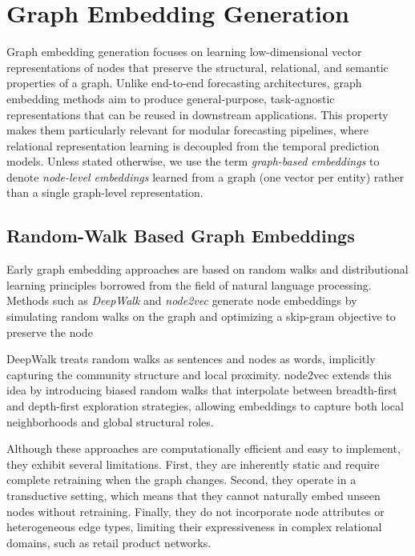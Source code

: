 \section{Graph Embedding Generation}
\label{sec:graph_embedding_generation}

Graph embedding generation focuses on learning low-dimensional vector representations of nodes that preserve the structural, relational, and semantic properties of a graph. Unlike end-to-end forecasting architectures, graph embedding methods aim to produce general-purpose, task-agnostic representations that can be reused in downstream applications. This property makes them particularly relevant for modular forecasting pipelines, where relational representation learning is decoupled from the temporal prediction models.
Unless stated otherwise, we use the term \emph{graph-based embeddings} to denote \emph{node-level embeddings} learned from a graph (one vector per entity) rather than a single graph-level representation.



\subsection{Random-Walk Based Graph Embeddings}

Early graph embedding approaches are based on random walks and distributional learning principles borrowed from the field of natural language processing. Methods such as \emph{DeepWalk} \cite{DBLP:journals/corr/PerozziAS14} and \emph{node2vec} \cite{DBLP:journals/corr/GroverL16} generate node embeddings by simulating random walks on the graph and optimizing a skip-gram objective to preserve the node

DeepWalk treats random walks as sentences and nodes as words, implicitly capturing the community structure and local proximity. node2vec extends this idea by introducing biased random walks that interpolate between breadth-first and depth-first exploration strategies, allowing embeddings to capture both local neighborhoods and global structural roles.

Although these approaches are computationally efficient and easy to implement, they exhibit several limitations. First, they are inherently static and require complete retraining when the graph changes. Second, they operate in a transductive setting, which means that they cannot naturally embed unseen nodes without retraining. Finally, they do not incorporate node attributes or heterogeneous edge types, limiting their expressiveness in complex relational domains, such as retail product networks.

